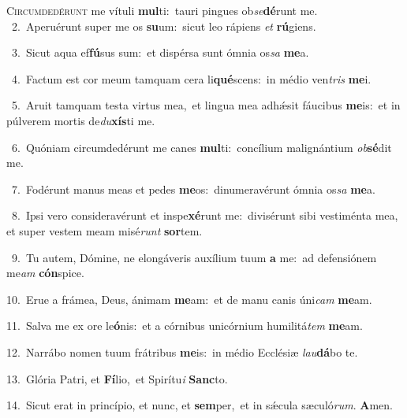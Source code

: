 \lettrine{\initial\textcolor{\initialcolor}{C}}{ircumdedérunt} me vítuli \textbf{mul}\-ti:~\star tauri pingues ob\-\textit{se}\-\textbf{dé}runt me.\\
{\numbfont\textcolor{\numbcolor}{~2.}}~Aperuérunt super me os \textbf{su}\-um:~\star sicut leo rápiens \textit{et} \textbf{rú}\-giens.\par
{\numbfont\textcolor{\numbcolor}{~3.}}~Sicut aqua ef\-\textbf{fú}\-sus sum:~\star et dispérsa sunt ómnia os\textit{sa} \textbf{me}\-a.\par
{\numbfont\textcolor{\numbcolor}{~4.}}~Factum est cor meum tamquam cera li\-\textbf{qué}\-scens:~\star in médio ven\textit{tris} \textbf{me}\-i.\par
{\numbfont\textcolor{\numbcolor}{~5.}}~Aruit tamquam testa virtus mea,~\dagger et lingua mea adhǽsit fáucibus \textbf{me}\-is:~\star et in púlverem mortis de\-\textit{du}\-\textbf{xís}ti me.\par
{\numbfont\textcolor{\numbcolor}{~6.}}~Quóniam circumdedérunt me canes \textbf{mul}\-ti:~\star concílium malignántium \textit{ob}\-\textbf{sé}dit me.\par
{\numbfont\textcolor{\numbcolor}{~7.}}~Fodérunt manus meas et pedes \textbf{me}\-os:~\star dinumeravérunt ómnia os\textit{sa} \textbf{me}\-a.\par
{\numbfont\textcolor{\numbcolor}{~8.}}~Ipsi vero consideravérunt et inspe\-\textbf{xé}\-runt me:~\star divisérunt sibi vestiménta mea, et super vestem meam misé\textit{runt} \textbf{sor}\-tem.\par
{\numbfont\textcolor{\numbcolor}{~9.}}~Tu autem, Dómine, ne elongáveris auxílium tuum \textbf{a} me:~\star ad defensiónem me\textit{am} \textbf{cón}\-spice.\par
{\numbfont\textcolor{\numbcolor}{10.}}~Erue a frámea, Deus, ánimam \textbf{me}\-am:~\star et de manu canis úni\textit{cam} \textbf{me}\-am.\par
{\numbfont\textcolor{\numbcolor}{11.}}~Salva me ex ore le\-\textbf{ó}\-nis:~\star et a córnibus unicórnium humilitá\textit{tem} \textbf{me}\-am.\par
{\numbfont\textcolor{\numbcolor}{12.}}~Narrábo nomen tuum frátribus \textbf{me}\-is:~\star in médio Ecclésiæ \textit{lau}\-\textbf{dá}bo te.\par
{\numbfont\textcolor{\numbcolor}{13.}}~Glória Patri, et \textbf{Fí}\-lio,~\star et Spirítu\textit{i} \textbf{Sanc}\-to.\par
{\numbfont\textcolor{\numbcolor}{14.}}~Sicut erat in princípio, et nunc, et \textbf{sem}\-per,~\star et in sǽcula sæculó\-\textit{rum}\-. \textbf{A}\-men.\par
